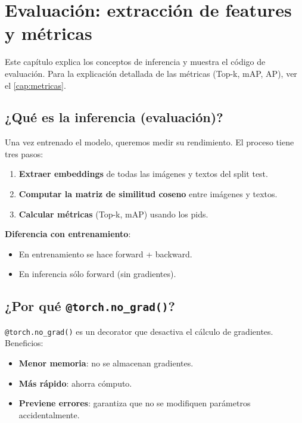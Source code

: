\chapter{Evaluación: extracción de features y métricas}
\label{cap:evaluacion}

Este capítulo explica los conceptos de inferencia y muestra el
código de evaluación. Para la explicación detallada de las
métricas (Top-k, mAP, AP), ver el \cref{cap:metricas}.

\section{¿Qué es la inferencia (evaluación)?}

Una vez entrenado el modelo, queremos medir su rendimiento. El
proceso tiene tres pasos:

\begin{enumerate}
  \item \textbf{Extraer embeddings} de todas las imágenes y
        textos del split test.
  \item \textbf{Computar la matriz de similitud coseno} entre
        imágenes y textos.
  \item \textbf{Calcular métricas} (Top-k, mAP) usando los pids.
\end{enumerate}

\noindent\textbf{Diferencia con entrenamiento}:
\begin{itemize}
  \item En entrenamiento se hace forward + backward.
  \item En inferencia sólo forward (sin gradientes).
\end{itemize}

\section{¿Por qué \texttt{@torch.no\_grad()}?}

\texttt{@torch.no\_grad()} es un decorator que desactiva el
cálculo de gradientes. Beneficios:

\begin{itemize}
  \item \textbf{Menor memoria}: no se almacenan gradientes.
  \item \textbf{Más rápido}: ahorra cómputo.
  \item \textbf{Previene errores}: garantiza que no se
        modifiquen parámetros accidentalmente.
\end{itemize}

